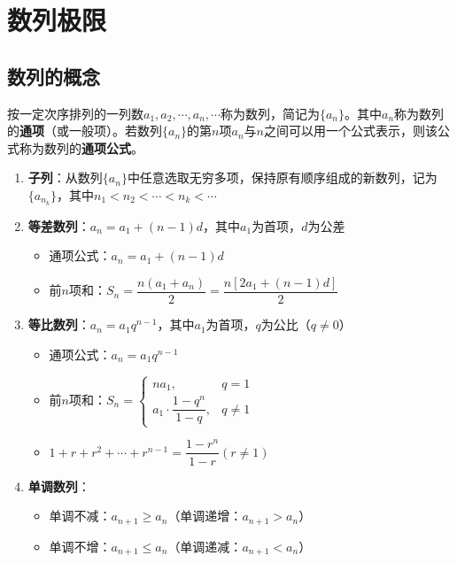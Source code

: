 \documentclass[../book.tex]{subfiles}
\begin{document}
    \section{数列极限}

    \subsection{数列的概念}

    按一定次序排列的一列数$a_1, a_2, \cdots, a_n, \cdots$称为数列，简记为$\{a_n\}$。其中$a_n$称为数列的\textbf{通项}（或一般项）。若数列$\{a_n\}$的第$n$项$a_n$与$n$之间可以用一个公式表示，则该公式称为数列的\textbf{通项公式}。

    \begin{enumerate}
        \item \textbf{子列}：从数列$\{a_n\}$中任意选取无穷多项，保持原有顺序组成的新数列，记为$\{a_{n_k}\}$，其中$n_1 < n_2 < \cdots < n_k < \cdots$

        \item \textbf{等差数列}：$a_n = a_1 + (n-1)d$，其中$a_1$为首项，$d$为公差
        \begin{itemize}
            \item 通项公式：$a_n = a_1 + (n-1)d$
            \item 前$n$项和：$S_n = \dfrac{n(a_1 + a_n)}{2} = \dfrac{n[2a_1 + (n-1)d]}{2}$
        \end{itemize}

        \item \textbf{等比数列}：$a_n = a_1 q^{n-1}$，其中$a_1$为首项，$q$为公比（$q \neq 0$）
        \begin{itemize}
            \item 通项公式：$a_n = a_1 q^{n-1}$
            \item 前$n$项和：$S_n = \begin{cases}
                                       na_1, & q = 1 \\ a_1 \cdot \dfrac{1-q^n}{1-q}, & q \neq 1
            \end{cases}$
            \item $1 + r + r^2 + \cdots + r^{n-1} = \dfrac{1-r^n}{1-r}(r \neq 1)$
        \end{itemize}

        \item \textbf{单调数列}：
        \begin{itemize}
            \item 单调不减：$a_{n+1} \ge a_n$（单调递增：$a_{n+1} > a_n$）
            \item 单调不增：$a_{n+1} \le a_n$（单调递减：$a_{n+1} < a_n$）
        \end{itemize}


\end{enumerate}
\end{document}
